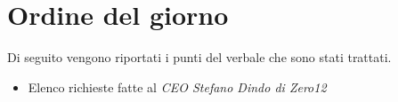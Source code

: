 \clearpage
\section{Ordine del giorno}
Di seguito vengono riportati i punti del verbale che sono stati trattati.
\begin{itemize}
	\item Elenco richieste fatte al \emph{CEO Stefano Dindo di Zero12}
\end{itemize}